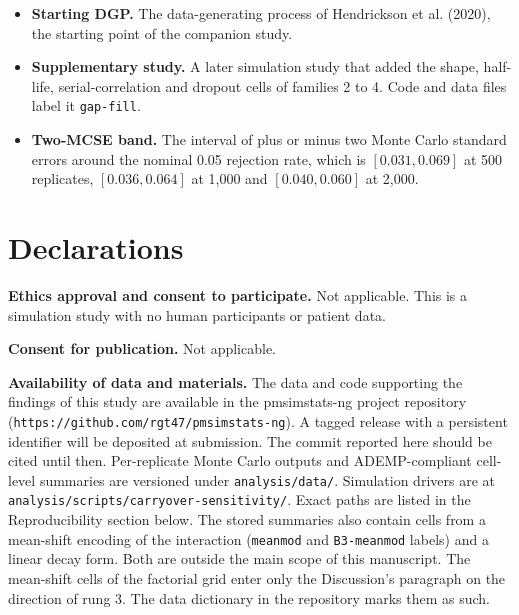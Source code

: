 \documentclass[
  11pt,
]{article}
\begin{document}
\begin{itemize}
  with the starting DGP: \texttt{lme4::lmer} with a random intercept, no
  residual correlation structure, a binary on-drug indicator, and
  Satterthwaite \(p\)-values. Unlike the published analysis it adds the
  expectancy term where expectancy varies and has no baseline row
  (Section \ref{sec-e0}).
\item
  \textbf{Starting DGP.} The data-generating process of Hendrickson et al.
  (2020), the starting point of the companion study.
\item
  \textbf{Supplementary study.} A later simulation study that added the
  shape, half-life, serial-correlation and dropout cells of families 2
  to 4. Code and data files label it \texttt{gap-fill}.
\item
  \textbf{Two-MCSE band.} The interval of plus or minus two Monte Carlo
  standard errors around the nominal 0.05 rejection rate, which is
  \([0.031, 0.069]\) at 500 replicates, \([0.036, 0.064]\) at 1,000 and
  \([0.040, 0.060]\) at 2,000.
\end{itemize}

\section{Declarations}\label{declarations}

\textbf{Ethics approval and consent to participate.} Not applicable. This
is a simulation study with no human participants or patient data.

\textbf{Consent for publication.} Not applicable.

\textbf{Availability of data and materials.} The data and code supporting
the findings of this study are available in the pmsimstats-ng
project repository (\texttt{https://github.com/rgt47/pmsimstats-ng}). A
tagged release with a persistent identifier will be deposited at
submission. The commit reported here should be cited until then.
Per-replicate Monte Carlo outputs and ADEMP-compliant cell-level
summaries are versioned under \texttt{analysis/data/}. Simulation drivers
are at \texttt{analysis/scripts/carryover-sensitivity/}. Exact paths are
listed in the Reproducibility section below. The stored summaries
also contain cells from a mean-shift encoding of the interaction
(\texttt{meanmod} and \texttt{B3-meanmod} labels) and a linear decay form. Both
are outside the main scope of this manuscript. The mean-shift cells
of the factorial grid enter only the Discussion's paragraph on the
direction of rung 3. The data dictionary in the repository marks them
as such.
\end{document}
